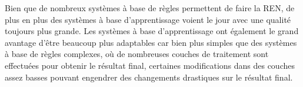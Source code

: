 \documentclass[PhD-Yoann-Dupont.tex]{subfiles}
\begin{document}
Bien que de nombreux systèmes à base de règles permettent de faire la REN, de plus en plus des systèmes à base d'apprentissage voient le jour avec une qualité toujours plus grande. Les systèmes à base d'apprentissage ont également le grand avantage d'être beaucoup plus adaptables car bien plus simples que des systèmes à base de règles complexes, où de nombreuses couches de traitement sont effectuées pour obtenir le résultat final, certaines modifications dans des couches assez basses pouvant engendrer des changements drastiques sur le résultat final.
\end{document}
